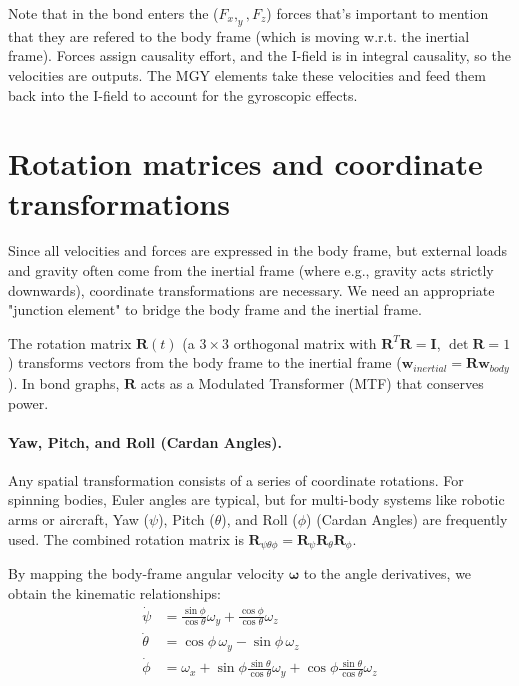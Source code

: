 Note that in the bond enters the ($F_x, _y, F_z$) forces that's important to mention that they are refered to the body frame (which is moving w.r.t. the inertial frame). Forces assign causality effort, and the I-field is in integral causality, so the velocities are outputs. The MGY elements take these velocities and feed them back into the I-field to account for the gyroscopic effects.

\section{Rotation matrices and coordinate transformations}

Since all velocities and forces are expressed in the body frame, but external loads and gravity often come from the inertial frame (where e.g., gravity acts strictly downwards), coordinate transformations are necessary. We need an appropriate "junction element" to bridge the body frame and the inertial frame.

The rotation matrix $\mathbf{R}(t)$ (a $3\times3$ orthogonal matrix with $\mathbf{R}^T\mathbf{R} = \mathbf{I}$, $\det\mathbf{R} = 1$) transforms vectors from the body frame to the inertial frame ($\mathbf{w}_{inertial} = \mathbf{R} \mathbf{w}_{body}$). In bond graphs, $\mathbf{R}$ acts as a Modulated Transformer (MTF) that conserves power.

\paragraph{Yaw, Pitch, and Roll (Cardan Angles).}
Any spatial transformation consists of a series of coordinate rotations. For spinning bodies, Euler angles are typical, but for multi-body systems like robotic arms or aircraft, Yaw ($\psi$), Pitch ($\theta$), and Roll ($\phi$) (Cardan Angles) are frequently used. The combined rotation matrix is $\mathbf{R}_{\psi\theta\phi} = \mathbf{R}_\psi \mathbf{R}_\theta \mathbf{R}_\phi$.

By mapping the body-frame angular velocity $\boldsymbol{\omega}$ to the angle derivatives, we obtain the kinematic relationships:
\begin{align}
  \dot{\psi} &= \frac{\sin\phi}{\cos\theta}\omega_y + \frac{\cos\phi}{\cos\theta}\omega_z \\
  \dot{\theta} &= \cos\phi\, \omega_y - \sin\phi\, \omega_z \\
  \dot{\phi} &= \omega_x + \sin\phi\frac{\sin\theta}{\cos\theta}\omega_y + \cos\phi\frac{\sin\theta}{\cos\theta}\omega_z
\end{align}


